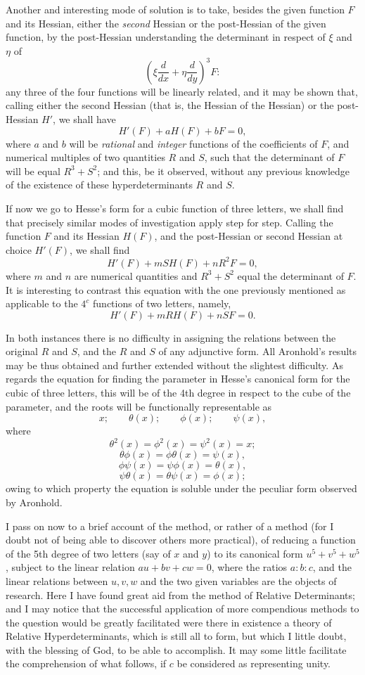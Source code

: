 \documentclass[11pt]{article}
\newcommand{\sourcepage}[1]{\marginpar{\scriptsize p.~#1}}
\begin{document}
{{\sourcepage{192}
Another and interesting mode of solution is to take, besides the given function $F$ and its Hessian, either the \emph{second} Hessian or the post-Hessian of the given function, by the post-Hessian understanding the determinant in respect of $\xi$ and $\eta$ of
\[
 \left(\xi\frac{d}{dx}+\eta\frac{d}{dy}\right)^3F:
\]
any three of the four functions will be linearly related, and it may be shown that, calling either the second Hessian (that is, the Hessian of the Hessian) or the post-Hessian $H'$, we shall have
\[
 H'(F)+aH(F)+bF=0,
\]
where $a$ and $b$ will be \emph{rational} and \emph{integer} functions of the coefficients of $F$, and numerical multiples of two quantities $R$ and $S$, such that the determinant of $F$ will be equal $R^3+S^2$; and this, be it observed, without any previous knowledge of the existence of these hyperdeterminants $R$ and $S$.

If now we go to Hesse's form for a cubic function of three letters, we shall find that precisely similar modes of investigation apply step for step. Calling the function $F$ and its Hessian $H(F)$, and the post-Hessian or second Hessian at choice $H'(F)$, we shall find
\[
 H'(F)+mS H(F)+nR^2F=0,
\]
where $m$ and $n$ are numerical quantities and $R^3+S^2$ equal the determinant of $F$. It is interesting to contrast this equation with the one previously mentioned as applicable to the $4^c$ functions of two letters, namely,
\[
 H'(F)+mR H(F)+nSF=0.
\]

In both instances there is no difficulty in assigning the relations between the original $R$ and $S$, and the $R$ and $S$ of any adjunctive form. All Aronhold's results may be thus obtained and further extended without the slightest difficulty. As regards the equation for finding the parameter in Hesse's canonical form for the cubic of three letters, this will be of the 4th degree in respect to the cube of the parameter, and the roots will be functionally representable as
\[
 x;\qquad \theta(x);\qquad \phi(x);\qquad \psi(x),
\]
where
\[
 \theta^2(x)=\phi^2(x)=\psi^2(x)=x;
\]
\[
 \theta\phi(x)=\phi\theta(x)=\psi(x),
\]
\[
 \phi\psi(x)=\psi\phi(x)=\theta(x),
\]
\[
 \psi\theta(x)=\theta\psi(x)=\phi(x);
\]
owing to which property the equation is soluble under the peculiar form observed by Aronhold.

\sourcepage{193}
I pass on now to a brief account of the method, or rather of a method (for I doubt not of being able to discover others more practical), of reducing a function of the 5th degree of two letters (say of $x$ and $y$) to its canonical form $u^5+v^5+w^5$, subject to the linear relation $au+bv+cw=0$, where the ratios $a:b:c$, and the linear relations between $u,v,w$ and the two given variables are the objects of research. Here I have found great aid from the method of Relative Determinants; and I may notice that the successful application of more compendious methods to the question would be greatly facilitated were there in existence a theory of Relative Hyperdeterminants, which is still all to form, but which I little doubt, with the blessing of God, to be able to accomplish. It may some little facilitate the comprehension of what follows, if $c$ be considered as representing unity.

}}
\end{document}
